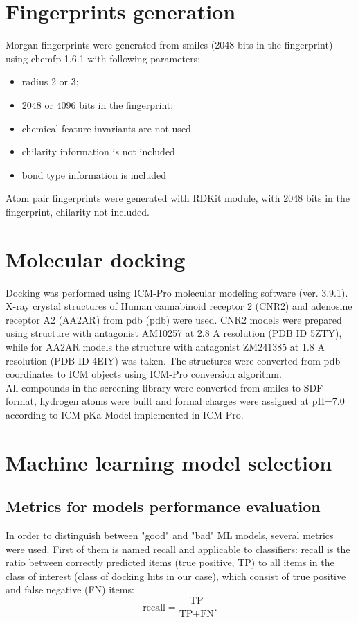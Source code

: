 \section{Fingerprints generation}

Morgan fingerprints were generated from \acrshort{smiles} (2048 bits in the fingerprint) using chemfp {\cite{Dalke2019TheProject}} 1.6.1 with following parameters:
\begin{itemize}
    \item radius 2 or 3;
    \item 2048 or 4096 bits in the fingerprint;
    \item chemical-feature invariants are not used
    \item chilarity information is not included
    \item bond type information is included
\end{itemize}

Atom pair fingerprints were generated with RDKit module, with 2048 bits in the fingerprint, chilarity not included.

\section{Molecular docking}
Docking was performed using ICM-Pro molecular modeling software (ver. 3.9.1).
X-ray crystal structures of Human cannabinoid receptor 2 (CNR2) and adenosine receptor A2 (AA2AR) from \acrlong{pdb} (\acrshort{pdb}) were used.
CNR2 models were prepared using structure with antagonist AM10257 at 2.8 A resolution (PDB ID 5ZTY), while for AA2AR models the structure with antagonist ZM241385 at 1.8 A resolution (PDB ID 4EIY) was taken.
The structures were converted from \acrshort{pdb} coordinates to ICM objects using ICM-Pro conversion algorithm.\\

All compounds in the screening library were converted from \acrshort{smiles} to SDF format, hydrogen atoms were built and formal charges were assigned at pH=7.0 according to ICM pKa Model implemented in ICM-Pro.

\section{Machine learning model selection}

\subsection{Metrics for models performance evaluation}
In order to distinguish between "good" and "bad" ML models, several metrics were used.
First of them is named recall and applicable to classifiers: recall is the ratio between correctly predicted items (true positive, TP) to all items in the class of interest (class of docking hits in our case), which consist of true positive and false negative (FN) items:
\begin{equation*}
    \text{recall} = \frac{\text{TP}}{\text{TP} + \text{FN}}.
\end{equation*}

